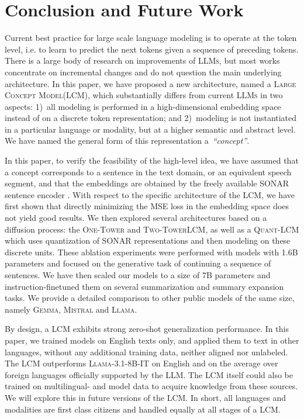 \documentclass[twoside,11pt]{fairmeta}
\newcommand{\llm}{\textsc{LLM}\xspace}
\newcommand{\llms}{\textsc{LLMs}\xspace}
\newcommand{\llama}{\textsc{Llama}\xspace}
\newcommand{\mistral}{\textsc{Mistral}\xspace}
\newcommand{\gemma}{\textsc{Gemma}\xspace}
\newcommand{\llamaIT}{\textsc{Llama-3.1-8B-IT}\xspace}
\newcommand{\sonar}{\textsc{SONAR}\xspace}
\newcommand{\lcm}{\textsc{LCM}\xspace}
\newcommand{\LCM}{\textsc{Large Concept Model}\xspace}
\newcommand{\twotower}{\textsc{Two-Tower}\xspace}
\newcommand{\interleaved}{\textsc{One-Tower}\xspace}
\newcommand{\qlcm}{\textsc{Quant-LCM}\xspace}
\begin{document}
\section{Conclusion and Future Work}
\label{sect:concl}
Current best practice for large scale language modeling is to operate at the token level, i.e. to learn to predict the next tokens given a sequence of preceding tokens. There is a large body of research on improvements of \llms, but most works concentrate on incremental changes and do not question the main underlying architecture.
In this paper, we have proposed a new architecture, named a \LCM (\lcm), which substantially differs from current \llms in two aspects:
1)~all modeling is performed in a high-dimensional embedding space instead of on a discrete token representation;
and 2)~modeling is not instantiated in a particular language or modality, but at a higher semantic and abstract level. We have named the general form of this representation a~\textit{``concept''}.

In this paper, to verify the feasibility of the high-level idea, we have assumed that a concept corresponds to a sentence in the text domain, or an equivalent speech segment, and that the embeddings are obtained by the freely available \sonar sentence encoder \citep{Duquenne:2023:sonar_arxiv}. With respect to the specific architecture of the \lcm, we have first shown that directly minimizing the MSE loss in the embedding space does not yield good results. We then explored several architectures based on a diffusion process: the \interleaved and \twotower \lcm, as well as a \qlcm which uses quantization of SONAR representations and then modeling on these discrete units.
These ablation experiments were performed with models with 1.6B parameters and focused on the generative task of continuing a sequence of sentences.
We have then scaled our models to a size of 7B parameters and instruction-finetuned them on several summarization and summary expansion tasks. We provide a detailed comparison to other public models of the same size, namely \gemma, \mistral and \llama.

By design, a \lcm exhibits strong zero-shot generalization performance. In this paper, we trained models on English texts only, and applied them to text in other languages, without any additional training data, neither aligned nor unlabeled.
The \lcm outperforms \llamaIT on English and on the average over foreign languages officially supported by the \llm.
The \lcm itself could also be trained on multilingual- and model data to acquire knowledge from these sources. We will explore this in future versions of the \lcm.
In short, all languages and modalities are first class citizens and handled equally at all stages of a \lcm.
\end{document}
